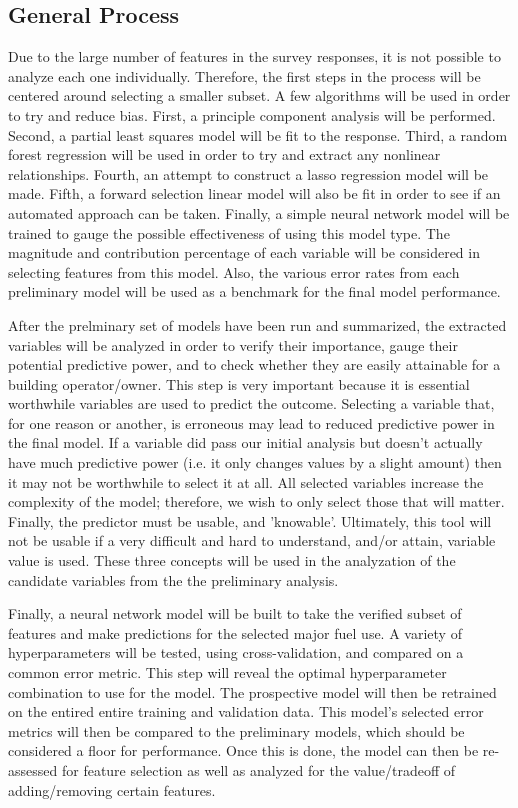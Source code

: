 \subsection{General Process}

Due to the large number of features in the survey responses, it is not possible to analyze each one individually.  Therefore, the first steps in the process will be centered around selecting a smaller subset.  A few algorithms will be used in order to try and reduce bias.  First, a principle component analysis will be performed.  Second, a partial least squares model will be fit to the response.  Third, a random forest regression will be used in order to try and extract any nonlinear relationships.  Fourth, an attempt to construct a lasso regression model will be made.  Fifth, a forward selection linear model will also be fit in order to see if an automated approach can be taken.  Finally, a simple neural network model will be trained to gauge the possible effectiveness of using this model type.  The magnitude and contribution percentage of each variable will be considered in selecting features from this model.  Also, the various error rates from each preliminary model will be used as a benchmark for the final model performance.

After the prelminary set of models have been run and summarized, the extracted variables will be analyzed in order to verify their importance, gauge their potential predictive power, and to check whether they are easily attainable for a building operator/owner.  This step is very important because it is essential worthwhile variables are used to predict the outcome.  Selecting a variable that, for one reason or another, is erroneous may lead to reduced predictive power in the final model.  If a variable did pass our initial analysis but doesn't actually have much predictive power (i.e. it only changes values by a slight amount) then it may not be worthwhile to select it at all.  All selected variables increase the complexity of the model; therefore, we wish to only select those that will matter.  Finally, the predictor must be usable, and 'knowable'.  Ultimately, this tool will not be usable if a very difficult and hard to understand, and/or attain, variable value is used.  These three concepts will be used in the analyzation of the candidate variables from the the preliminary analysis. 

Finally, a neural network model will be built to take the verified subset of features and make predictions for the selected major fuel use.  A variety of hyperparameters will be tested, using cross-validation, and compared on a common error metric.  This step will reveal the optimal hyperparameter combination to use for the model.  The prospective model will then be retrained on the entired entire training and validation data.  This model's selected error metrics will then be compared to the preliminary models, which should be considered a floor for performance.  Once this is done, the model can then be re-assessed for feature selection as well as analyzed for the value/tradeoff of adding/removing certain features.  

